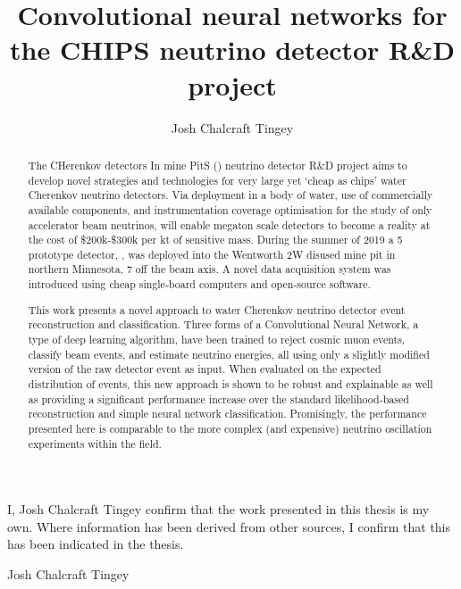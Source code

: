 
\title{Convolutional neural networks for the CHIPS neutrino detector R\&D project}
\author{Josh Chalcraft Tingey}

\thispagestyle{plain}

\begin{declaration} %
    I, Josh Chalcraft Tingey confirm that the work presented in this thesis is my own. Where
    information has been derived from other sources, I confirm that this has been indicated in the
    thesis.
    \vspace*{1cm}
    \begin{flushright}
        Josh Chalcraft Tingey
    \end{flushright}
\end{declaration}

\begin{abstract} %
    The CHerenkov detectors In mine PitS (\chips) neutrino detector R\&D project aims to develop
    novel strategies and technologies for very large yet `cheap as chips' water Cherenkov neutrino
    detectors. Via deployment in a body of water, use of commercially available components, and
    instrumentation coverage optimisation for the study of only accelerator beam neutrinos, \chips
    will enable megaton scale detectors to become a reality at the cost of \$200k-\$300k per kt of
    sensitive mass. During the summer of 2019 a \unit{5}{} prototype \chips detector,
    \chipsfive, was deployed into the Wentworth 2W disused mine pit in northern Minnesota,
    \unit{7}{} off the \numi beam axis. A novel data acquisition system was introduced
    using cheap single-board computers and open-source software.

    This work presents a novel approach to water Cherenkov neutrino detector event reconstruction
    and classification. Three forms of a Convolutional Neural Network, a type of deep learning
    algorithm, have been trained to reject cosmic muon events, classify beam events, and estimate
    neutrino energies, all using only a slightly modified version of the raw detector event as
    input. When evaluated on the expected distribution of \chipsfive events, this new approach is
    shown to be robust and explainable as well as providing a significant performance increase
    over the standard likelihood-based reconstruction and simple neural network classification.
    Promisingly, the performance presented here is comparable to the more complex (and expensive)
    neutrino oscillation experiments within the field.
\end{abstract}

